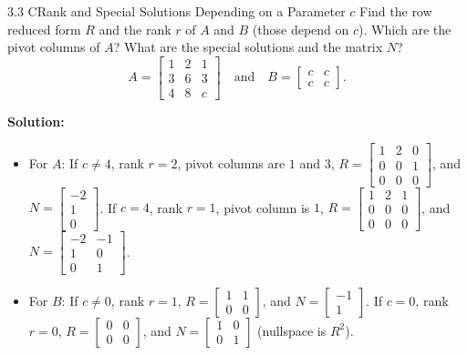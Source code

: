 \documentclass[11pt,a4paper,openany,oneside]{book}
\def\mathbf#1{#1}%
\numberwithin{equation}{chapter}
\begin{document}
\begin{example}{3.3 C}{Rank and Special Solutions Depending on a Parameter $c$}
Find the row reduced form $R$ and the rank $r$ of $A$ and $B$ (those depend on $c$). Which are the pivot columns of $A$? What are the special solutions and the matrix $N$?
\[
A = \begin{bmatrix} 1 & 2 & 1 \\ 3 & 6 & 3 \\ 4 & 8 & c \end{bmatrix} \quad \text{and} \quad B = \begin{bmatrix} c & c \\ c & c \end{bmatrix}.
\]
\end{example}
\textbf{Solution:}
\begin{itemize}
\item For $A$: If $c \neq 4$, rank $r = 2$, pivot columns are $1$ and $3$, $R = \begin{bmatrix}1 & 2 & 0\\0 & 0 & 1\\0 & 0 & 0\end{bmatrix}$, and $N = \begin{bmatrix}-2\\1\\0\end{bmatrix}$. If $c = 4$, rank $r = 1$, pivot column is $1$, $R = \begin{bmatrix}1 & 2 & 1\\0 & 0 & 0\\0 & 0 & 0\end{bmatrix}$, and $N = \begin{bmatrix}-2 & -1\\1 & 0\\0 & 1\end{bmatrix}$.
\item For $B$: If $c \neq 0$, rank $r = 1$, $R = \begin{bmatrix}1 & 1\\0 & 0\end{bmatrix}$, and $N = \begin{bmatrix}-1\\1\end{bmatrix}$. If $c = 0$, rank $r = 0$, $R = \begin{bmatrix}0 & 0\\0 & 0\end{bmatrix}$, and $N = \begin{bmatrix}1 & 0\\0 & 1\end{bmatrix}$ (nullspace is $\mathbf{R}^2$).
\end{itemize}
\end{document}
